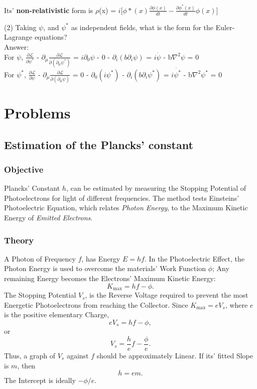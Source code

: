 \documentclass[a4paper, 10pt, onepage]{elegantbook}
\begin{document}
Its' \textbf{non-relativistic} form is $\rho$(x) = $i[\phi*(x) \frac{\partial \phi(x)}{dt} - \frac{\partial \phi^*(x)}{dt} \phi(x)$]

(2) Taking $\psi$, and $\psi^{*}$ as independent fields, what is the form for the Euler-Lagrange equations?  \\

Answer:  \\

For $\psi$, \quad $\frac{\partial \mathscr{L}}{\partial \psi^{*}}$ - $\partial_\mu \frac{\partial \mathscr{L}}{\partial(\partial_\mu \psi^{*})}$ = $i \partial_0 \psi$ - $0$ - $\partial_{i} (b \partial_{i} \psi)$ = $i \dot{\psi}$ - b$\nabla^{2} \psi$ = $0$ \\

For $\psi^{*}$, \quad $\frac{\partial \mathscr{L}}{\partial \psi}$ - $\partial_\mu \frac{\partial \mathscr{L}}{\partial(\partial_\mu \psi)}$ = $0$ - $\partial_0(i \psi^{*})$ - $\partial_{i} (b \partial_{i} \psi^{*})$ = $i \dot{\psi^{*}}$ - b$\nabla^{2} \psi^{*}$ = $0$ \\

\chapter{Problems}

\section{Estimation of the Plancks' constant}

\subsection{Objective}

Plancks' Constant \(h\), can be estimated by measuring the Stopping Potential of Photoelectrons for light of different frequencies. The method tests Einsteins' Photoelectric Equation, which relates \emph{Photon Energy}, to the Maximum Kinetic Energy of \emph{Emitted Electrons}.

\subsection{Theory}

A Photon of Frequency \(f\), has Energy \(E=hf\). In the Photoelectric Effect, the Photon Energy is used to overcome the materials' Work Function \(\phi\); Any remaining Energy becomes the Electrons' Maximum Kinetic Energy:
\[
K_{\max}=hf-\phi.
\]
The Stopping Potential \(V_s\), is the Reverse Voltage required to prevent the most Energetic Photoelectrons from reaching the Collector. Since \(K_{\max}=eV_s\), where \(e\) is the positive elementary Charge,
\[
eV_s=hf-\phi,
\]
or
\[
\boxed{
V_s=\frac{h}{e}f-\frac{\phi}{e}
}.
\]
Thus, a graph of \(V_s\) against \(f\) should be approximately Linear.
If its' fitted Slope is \(m\), then
\[
\boxed{h=em}.
\]
The Intercept is ideally \(-\phi/e\).
\end{document}
